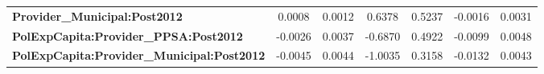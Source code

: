 \begin{center}
\begin{tabular}{lcccccc}
\textbf{Provider\_Municipal:Post2012}              &       0.0008       &       0.0012       &      0.6378     &      0.5237      &      -0.0016      &       0.0031       \\
\textbf{PolExpCapita:Provider\_PPSA:Post2012}      &      -0.0026       &       0.0037       &     -0.6870     &      0.4922      &      -0.0099      &       0.0048       \\
\textbf{PolExpCapita:Provider\_Municipal:Post2012} &      -0.0045       &       0.0044       &     -1.0035     &      0.3158      &      -0.0132      &       0.0043       \\
\bottomrule
\end{tabular}
\end{center}
